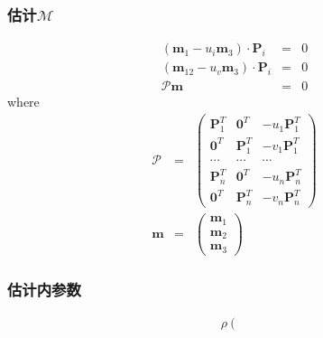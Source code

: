 \documentclass{beamer}
\newcommand{\cdummy}{\cdot}
\newcommand{\tmmathbf}[1]{\ensuremath{\boldsymbol{#1}}}
\begin{document}
{{\begin{frame}
\end{frame}}{\begin{frame}
  \frametitle{估计$\mathcal{M}$}
  \begin{eqnarray*}
    (\tmmathbf{m}_1 - u_i \tmmathbf{m}_3) \cdummy \tmmathbf{P}_i & = & 0\\
    (\tmmathbf{m}_{12} - u_v \tmmathbf{m}_3) \cdummy \tmmathbf{P}_i & = & 0\\
    \mathcal{P}\tmmathbf{m} & = & 0
  \end{eqnarray*}
  where
  \begin{eqnarray*}
    \mathcal{P} & = & \left(\begin{array}{ccc}
      \tmmathbf{P}_1^T & \tmmathbf{0}^T & - u_1 \tmmathbf{P}_1^T\\
      \tmmathbf{0}^T & \tmmathbf{P}_1^T & - v_1 \tmmathbf{P}_1^T\\
      \cdots & \cdots & \cdots\\
      \tmmathbf{P}_n^T & \tmmathbf{0}^T & - u_n \tmmathbf{P}_n^T\\
      \tmmathbf{0}^T & \tmmathbf{P}_n^T & - v_n \tmmathbf{P}_n^T
    \end{array}\right)\\
    \tmmathbf{m} & = & \left(\begin{array}{c}
      \tmmathbf{m}_1\\
      \tmmathbf{m}_2\\
      \tmmathbf{m}_3
    \end{array}\right)
  \end{eqnarray*}
\end{frame}}{\begin{frame}
  \frametitle{估计内参数}
  \begin{eqnarray*}
    \rho \left(\begin{array}{cc}

\end{array}
\end{eqnarray*}
\end{frame}}}
\end{document}
